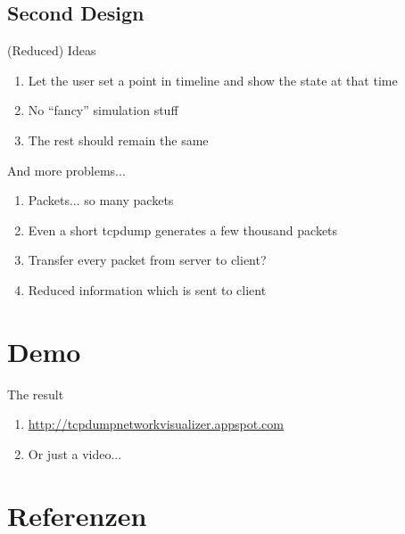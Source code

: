 \documentclass{beamer}
\begin{document}
\subsection{Second Design}

\begin{frame}{(Reduced) Ideas}
 \begin{enumerate}
  \item Let the user set a point in timeline and show the state at that time
  \item No ``fancy'' simulation stuff
  \item The rest should remain the same
 \end{enumerate}

\end{frame}


\begin{frame}{And more problems...}
 \begin{enumerate}
  \item Packets... so many packets
  \item Even a short tcpdump generates a few thousand packets
  \item Transfer every packet from server to client?
  \item Reduced information which is sent to client
 \end{enumerate}
\end{frame}

\section{Demo}

\begin{frame}{The result}
\begin{enumerate}
 \item \url{http://tcpdumpnetworkvisualizer.appspot.com}
 \item Or just a video...
\end{enumerate}
\end{frame}



\section{Referenzen}

\end{document}
